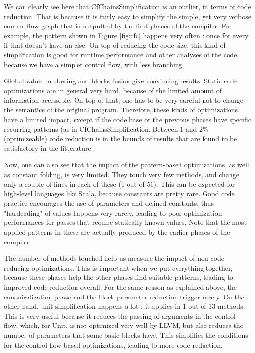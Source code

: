 \documentclass[11pt,a4paper]{article}
\newcommand{\scala}[1]{\textsf{#1}}
\begin{document}
We can clearly see here that \scala{CfChainsSimplification} is an outlier, in terms of code reduction. That is because it is fairly easy to simplify the simple, yet very verbose control flow graph that is outputted by the first phases of the compiler. For example, the pattern shown in Figure \ref{fig:cfc} happens very often : once for every \scala{if} that doesn't have an \scala{else}. On top of reducing the code size, this kind of simplification is good for runtime performance and other analyses of the code, because we have a simpler control flow, with less branching.

Global value numbering and blocks fusion give convincing results. Static code optimizations are in general very hard, because of the limited amount of information accessible. On top of that, one has to be very careful not to change the semantics of the original program. Therefore, these kinds of optimizations have a limited impact, except if the code base or the previous phases have specific recurring patterns (as in \scala{CfChainsSimplification}. Between 1 and 2\% (optimizeable) code reduction is in the bounds of results that are found to be satisfactory in the litterature.

Now, one can also see that the impact of the pattern-based optimizations, as well as constant folding, is very limited. They touch very few methods, and change only a couple of lines in each of these (1 out of 50). This can be expected for high-level languages like Scala, because constants are pretty rare. Good code practice encourages the use of parameters and defined constants, thus "hardcoding" of values happens very rarely, leading to poor optimization performances for passes that require statically known values. Note that the most applied patterns in these are actually produced by the earlier phases of the compiler.

The number of methods touched help us measure the impact of non-code reducing optimizations. This is important when we put everything together, because these phases help the other phases find suitable patterns, leading to improved code reduction overall.  For the same reason as explained above, the canonicalization phase and the block parameter reduction trigger rarely. On the other hand, unit simplification happens a lot : it applies in 1 out of 13 methods. This is very useful because it reduces the passing of arguments in the control flow, which, for \scala{Unit}, is not optimized very well by LLVM, but also reduces the number of parameters that some basic blocks have. This simplifies the conditions for the control flow based optimizations, leading to more code reduction.
\end{document}
